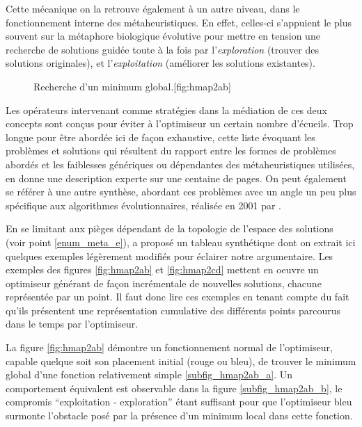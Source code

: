 Cette mécanique on la retrouve également à un autre niveau, dans le fonctionnement interne des métaheuristiques. En effet, celles-ci s'appuient le plus souvent sur la métaphore biologique évolutive pour mettre en tension une recherche de solutions guidée toute à la fois par l'\textit{exploration} (trouver des solutions originales), et l'\textit{exploitation} (améliorer les solutions existantes).

\begin{figure}[!htbp]
\begin{sidecaption}[fortoc]{Recherche d'un minimum global.}[fig:hmap2ab]
 \centering
 \qquad
\end{sidecaption}
\end{figure}

Les opérateurs intervenant comme stratégies dans la médiation de ces deux concepts sont conçus pour éviter à l'optimiseur un certain nombre d'écueils. Trop longue pour être abordée ici de façon exhaustive, cette liste évoquant les problèmes et solutions qui résultent du rapport entre les formes de problèmes abordés et les faiblesses génériques ou dépendantes des métaheuristiques utilisées, \textcite{Weise2011} en donne une description experte sur une centaine de pages. On peut également se référer à une autre synthèse, abordant ces problèmes avec un angle un peu plus spécifique aux algorithmes évolutionnaires, réalisée en 2001 par \textcite[316-445]{Deb2001}.

En se limitant aux pièges dépendant de la topologie de l'espace des solutions (voir point \ref{enum_meta_e}), \textcite[140]{Weise2011} a proposé un tableau synthétique dont on extrait ici quelques exemples légèrement modifiés pour éclairer notre argumentaire. Les exemples des figures \ref{fig:hmap2ab} et \ref{fig:hmap2cd} mettent en oeuvre un optimiseur générant de façon incrémentale de nouvelles solutions, chacune représentée par un point. Il faut donc lire ces exemples en tenant compte du fait qu'ils présentent une représentation cumulative des différents points parcourus dans le temps par l'optimiseur.

La figure \ref{fig:hmap2ab} démontre un fonctionnement normal de l'optimiseur, capable quelque soit son placement initial (rouge ou bleu), de trouver le minimum global d'une fonction relativement simple \ref{subfig_hmap2ab_a}. Un comportement équivalent est observable dans la figure \ref{subfig_hmap2ab_b}, le compromis \enquote{exploitation - exploration} étant suffisant pour que l'optimiseur bleu surmonte l'obstacle posé par la présence d'un minimum local dans cette fonction.

